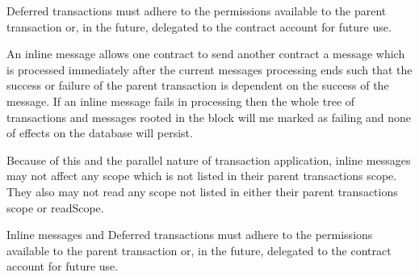 Deferred transactions must adhere to the permissions available to the parent transaction or, in the future, delegated to the contract account for future use.

An inline message allows one contract to send another contract a message which is processed immediately after the current message\textquotesingle{}s processing ends such that the success or failure of the parent transaction is dependent on the success of the message. If an inline message fails in processing then the whole tree of transactions and messages rooted in the block will me marked as failing and none of effects on the database will persist.

Because of this and the parallel nature of transaction application, inline messages may not affect any {\ttfamily scope} which is not listed in their parent transaction\textquotesingle{}s {\ttfamily scope}. They also may not read any {\ttfamily scope} not listed in either their parent transaction\textquotesingle{}s {\ttfamily scope} or {\ttfamily read\+Scope}.

Inline messages and Deferred transactions must adhere to the permissions available to the parent transaction or, in the future, delegated to the contract account for future use. 